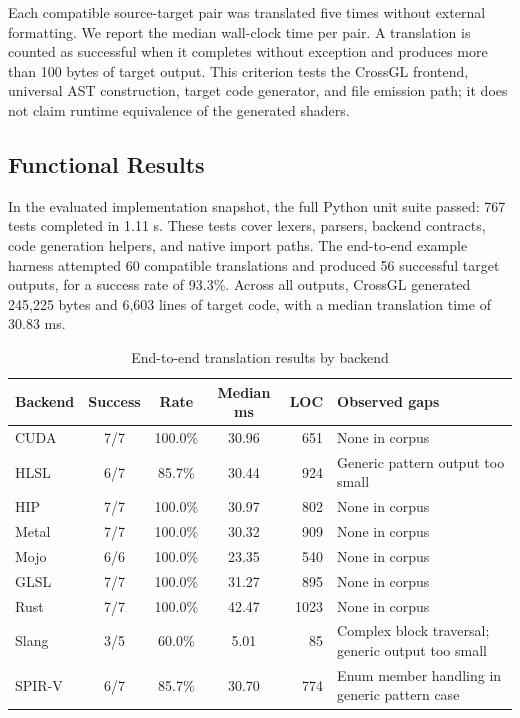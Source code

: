 \documentclass{svproc}
\begin{document}
Each compatible source-target pair was translated five times without external formatting. We report the median wall-clock time per pair. A translation is counted as successful when it completes without exception and produces more than 100 bytes of target output. This criterion tests the CrossGL frontend, universal AST construction, target code generator, and file emission path; it does not claim runtime equivalence of the generated shaders.

\subsection{Functional Results}

In the evaluated implementation snapshot, the full Python unit suite passed: 767 tests completed in 1.11 s. These tests cover lexers, parsers, backend contracts, code generation helpers, and native import paths. The end-to-end example harness attempted 60 compatible translations and produced 56 successful target outputs, for a success rate of 93.3\%. Across all outputs, CrossGL generated 245,225 bytes and 6,603 lines of target code, with a median translation time of 30.83 ms.

\begin{table}[!ht]
\caption{End-to-end translation results by backend}
\label{tab:backendresults}
\centering
\footnotesize
\setlength{\tabcolsep}{3pt}
\renewcommand{\arraystretch}{1.0}
\begin{tabularx}{\textwidth}{@{}L{1.45cm}cccrY@{}}
\toprule
\textbf{Backend} & \textbf{Success} & \textbf{Rate} & \textbf{Median ms} & \textbf{LOC} & \textbf{Observed gaps} \\
\midrule
CUDA & 7/7 & 100.0\% & 30.96 & 651 & None in corpus \\
HLSL & 6/7 & 85.7\% & 30.44 & 924 & Generic pattern output too small \\
HIP & 7/7 & 100.0\% & 30.97 & 802 & None in corpus \\
Metal & 7/7 & 100.0\% & 30.32 & 909 & None in corpus \\
Mojo & 6/6 & 100.0\% & 23.35 & 540 & None in corpus \\
GLSL & 7/7 & 100.0\% & 31.27 & 895 & None in corpus \\
Rust & 7/7 & 100.0\% & 42.47 & 1023 & None in corpus \\
Slang & 3/5 & 60.0\% & 5.01 & 85 & Complex block traversal; generic output too small \\
SPIR-V & 6/7 & 85.7\% & 30.70 & 774 & Enum member handling in generic pattern case \\
\bottomrule
\end{tabularx}
\end{table}
\end{document}
